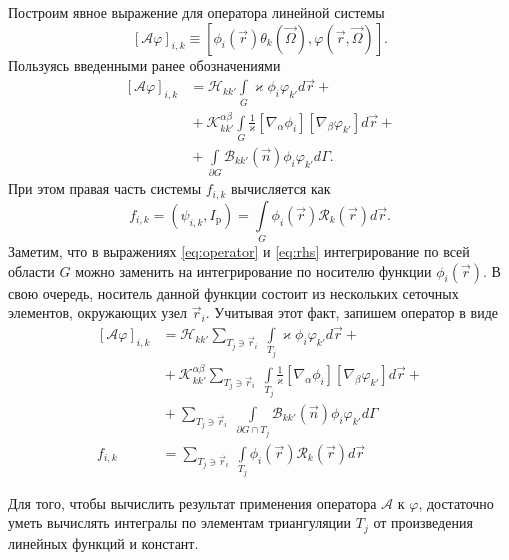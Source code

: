 Построим явное выражение для оператора линейной системы
\[
[\mathcal{A} \varphi]_{i,k} \equiv [\phi_i(\vec r)\theta_k(\vec \Omega), \varphi(\vec r, \vec \Omega)].
\]
Пользуясь введенными ранее обозначениями
\begin{equation}
\begin{aligned}
[\mathcal{A} \varphi]_{i,k} &= \mathscr H_{kk'} \int\limits_{G} \varkappa \phi_i \varphi_{k'} d\vec r + {}\\
&{}+ \mathscr K_{kk'}^{\alpha\beta} \int\limits_{G} \frac{1}{\varkappa} [\nabla_\alpha \phi_{i}] [\nabla_\beta \varphi_{k'}] d\vec r +{}\\
&{}+ \int\limits_{\partial G} \mathscr B_{kk'}(\vec n) \phi_{i}\varphi_{k'} d\Gamma.
\end{aligned}
\label{eq:operator}
\end{equation}
При этом правая часть системы $f_{i,k}$ вычисляется как
\begin{equation}
f_{i,k} = (\psi_{i,k}, I_\text{p}) = \int\limits_{G} \phi_i(\vec r) \mathscr R_k(\vec r) d\vec r.
\label{eq:rhs}
\end{equation}
Заметим, что в выражениях \eqref{eq:operator} и \eqref{eq:rhs} интегрирование по всей области $G$ можно заменить на интегрирование по носителю функции $\phi_i(\vec r)$. В свою очередь, носитель данной функции состоит из нескольких сеточных элементов, окружающих узел $\vec r_i$. Учитывая этот факт, запишем оператор в виде
\begin{equation}
\begin{aligned}
[\mathcal{A} \varphi]_{i,k} &= \mathscr H_{kk'} \sum_{T_j \ni \vec r_i}\;\int\limits_{T_j} \varkappa \phi_i \varphi_{k'} d\vec r + {}\\
&{}+ \mathscr K_{kk'}^{\alpha\beta} \sum_{T_j \ni \vec r_i}\;\int\limits_{T_j} \frac{1}{\varkappa} [\nabla_\alpha \phi_{i}] [\nabla_\beta \varphi_{k'}] d\vec r + {}\\
&{}+ \sum_{T_j \ni \vec r_i} \;\int\limits_{\partial G \cap T_j} \mathscr B_{kk'}(\vec n) \phi_{i}\varphi_{k'} d\Gamma\\
f_{i,k} &= \sum_{T_j \ni \vec r_i}\;\int\limits_{T_j} \phi_i(\vec r) \mathscr R_k(\vec r) d\vec r
\end{aligned}
\label{eq:operator2}
\end{equation}

Для того, чтобы вычислить результат применения оператора $\mathcal{A}$ к $\varphi$, достаточно уметь вычислять интегралы по элементам триангуляции $T_j$ от произведения линейных функций и констант.

